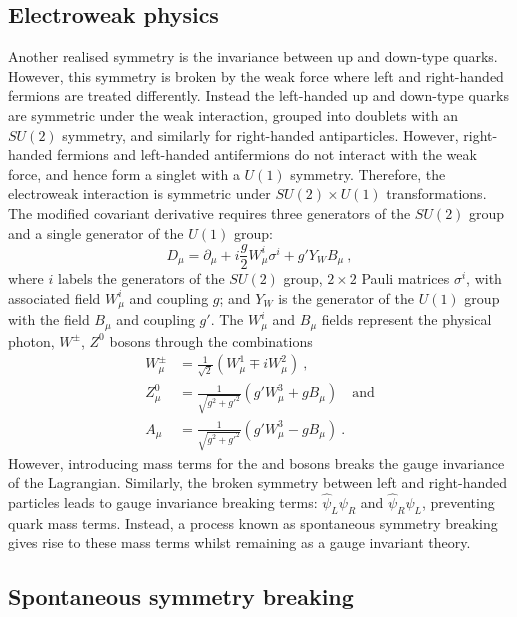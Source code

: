 \subsection{Electroweak physics}\label{sec:ew-theory}

Another realised symmetry is the invariance between up and down-type quarks.  However, this symmetry is broken by the weak force where left and right-handed fermions are treated differently. Instead the left-handed up and down-type quarks are symmetric under the weak interaction, grouped into doublets with an $SU(2)$ symmetry, and similarly for right-handed antiparticles. However, right-handed fermions and left-handed antifermions do not interact with the weak force, and hence form a singlet with a $U(1)$ symmetry. Therefore, the electroweak interaction is symmetric under $SU(2)\times U(1)$ transformations.  The modified covariant derivative requires three generators of the $SU(2)$ group and a single generator of the $U(1)$ group:
%
\begin{equation}
    D_\mu = \partial_\mu + i\frac{g}{2}W_\mu^i\sigma^i + g' Y_W B_\mu\ ,
\end{equation}
%
where $i$ labels the generators of the $SU(2)$ group, $2\times 2$ Pauli matrices $\sigma^i$, with associated field $W_\mu^i$ and coupling $g$; and $Y_W$ is the generator of the $U(1)$ group with the field $B_\mu$ and coupling $g'$. The $W_\mu^i$ and $B_\mu$ fields represent the physical photon, $W^{\pm}$, $Z^{0}$ bosons through the combinations \cite{Peskin:1995ev}
%
\begin{align}
    W_\mu^\pm & = \frac{1}{\sqrt{2}}\left(W_\mu^1 \mp i W_\mu^2\right)\ ,\\\nonumber
    Z^0_\mu & = \frac{1}{\sqrt{g^2+g'^2}}\left(g'W_\mu^3 + gB_\mu\right)\quad\mathrm{and}\\\nonumber
    A_\mu & = \frac{1}{\sqrt{g^2+g'^2}}\left(g'W_\mu^3 - gB_\mu\right)\ .
\end{align}
%
However, introducing mass terms for the \PW and \PZ bosons breaks the gauge invariance of the Lagrangian. Similarly, the broken symmetry between left and right-handed particles leads to gauge invariance breaking terms: $\hat{\psi}_L\psi_R$ and $\hat{\psi}_R\psi_L$, preventing quark mass terms. Instead, a process known as spontaneous symmetry breaking gives rise to these mass terms whilst remaining as a gauge invariant theory.


\subsection{Spontaneous symmetry breaking}

